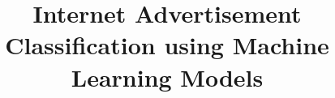 \documentclass[twoside,final]{hcmut-report}
\title{Internet Advertisement Classification using Machine Learning Models}
\begin{document}
\coverpage%


\tableofcontents
\listoffigures
\listoftables
\lstlistoflistings{}

\clearpage



\pagebreak



\pagebreak



\pagebreak



\pagebreak



\pagebreak



\pagebreak



\clearpage



\nocite{*}
\end{document}

